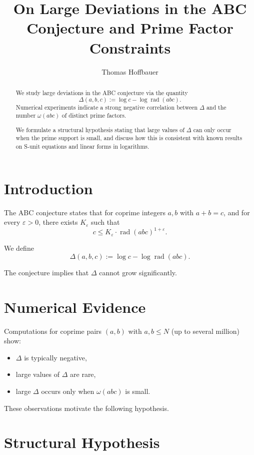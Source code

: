 \documentclass{article}
\title{On Large Deviations in the ABC Conjecture and Prime Factor Constraints}
\author{Thomas Hoffbauer}
\date{}
\newcommand{\rad}{\operatorname{rad}}
\begin{document}
	\maketitle
	
	\begin{abstract}
		We study large deviations in the ABC conjecture via the quantity
		\[
		\Delta(a,b,c) := \log c - \log \rad(abc).
		\]
		Numerical experiments indicate a strong negative correlation between $\Delta$
		and the number $\omega(abc)$ of distinct prime factors.
		
		We formulate a structural hypothesis stating that large values of $\Delta$
		can only occur when the prime support is small, and discuss how this
		is consistent with known results on S-unit equations and linear forms
		in logarithms.
	\end{abstract}
	
	\section{Introduction}
	
	The ABC conjecture states that for coprime integers $a,b$ with $a+b=c$,
	and for every $\varepsilon>0$, there exists $K_\varepsilon$ such that
	\[
	c \le K_\varepsilon \cdot \rad(abc)^{1+\varepsilon}.
	\]
	
	We define
	\[
	\Delta(a,b,c) := \log c - \log \rad(abc).
	\]
	
	The conjecture implies that $\Delta$ cannot grow significantly.
	
	\section{Numerical Evidence}
	
	Computations for coprime pairs $(a,b)$ with $a,b \le N$ (up to several million)
	show:
	
	\begin{itemize}
		\item $\Delta$ is typically negative,
		\item large values of $\Delta$ are rare,
		\item large $\Delta$ occurs only when $\omega(abc)$ is small.
	\end{itemize}
	
	These observations motivate the following hypothesis.
	
	\section{Structural Hypothesis}
	
\end{document}
